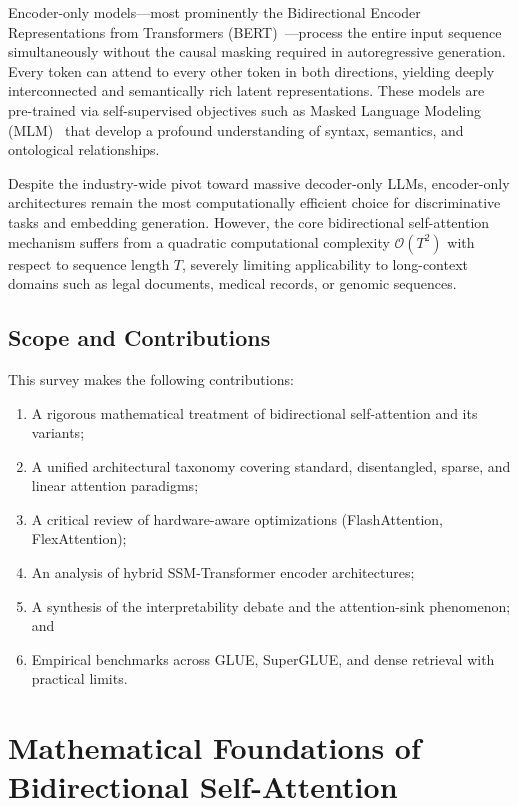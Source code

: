 \documentclass[11pt]{article}
\begin{document}
Encoder-only models—most prominently the Bidirectional Encoder Representations from Transformers (BERT)~\cite{devlin2018bert}—process the entire input sequence simultaneously without the causal masking required in autoregressive generation. Every token can attend to every other token in both directions, yielding deeply interconnected and semantically rich latent representations. These models are pre-trained via self-supervised objectives such as Masked Language Modeling (MLM)~\cite{devlin2018bert} that develop a profound understanding of syntax, semantics, and ontological relationships.

Despite the industry-wide pivot toward massive decoder-only LLMs, encoder-only architectures remain the most computationally efficient choice for discriminative tasks and embedding generation. However, the core bidirectional self-attention mechanism suffers from a quadratic computational complexity $\mathcal{O}(T^2)$ with respect to sequence length $T$, severely limiting applicability to long-context domains such as legal documents, medical records, or genomic sequences.

\subsection{Scope and Contributions}
This survey makes the following contributions:
\begin{enumerate}[label=(\roman*)]
  \item A rigorous mathematical treatment of bidirectional self-attention and its variants;
  \item A unified architectural taxonomy covering standard, disentangled, sparse, and linear attention paradigms;
  \item A critical review of hardware-aware optimizations (FlashAttention, FlexAttention);
  \item An analysis of hybrid SSM-Transformer encoder architectures;
  \item A synthesis of the interpretability debate and the attention-sink phenomenon; and
  \item Empirical benchmarks across GLUE, SuperGLUE, and dense retrieval with practical limits.
\end{enumerate}

\section{Mathematical Foundations of Bidirectional Self-Attention}
\end{document}
